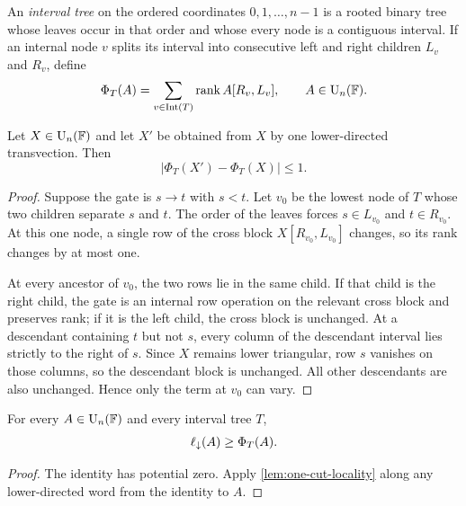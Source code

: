 \begin{definition}
An \emph{interval tree} on the ordered coordinates $0,1,\ldots,n-1$ is a rooted binary tree whose leaves occur in that order and whose every node is a contiguous interval.  If an internal node $v$ splits its interval into consecutive left and right children $L_v$ and $R_v$, define
\begin{equation}\label{eq:tree-potential}
\Phi_T(A)
=
\sum_{v\in\operatorname{Int}(T)}
\operatorname{rank} A[R_v,L_v],
\qquad A\in\operatorname{U}_n(\mathbb F).
\end{equation}
\end{definition}

\begin{lemma}\label{lem:one-cut-locality}
Let $X\in\operatorname{U}_n(\mathbb F)$ and let $X'$ be obtained from $X$ by one lower-directed transvection.  Then
\[
\bigl|\Phi_T(X')-\Phi_T(X)\bigr|\le1.
\]
\end{lemma}

\begin{proof}
Suppose the gate is $s\to t$ with $s<t$.  Let $v_0$ be the lowest node of $T$ whose two children separate $s$ and $t$.  The order of the leaves forces $s\in L_{v_0}$ and $t\in R_{v_0}$.  At this one node, a single row of the cross block $X[R_{v_0},L_{v_0}]$ changes, so its rank changes by at most one.

At every ancestor of $v_0$, the two rows lie in the same child.  If that child is the right child, the gate is an internal row operation on the relevant cross block and preserves rank; if it is the left child, the cross block is unchanged.  At a descendant containing $t$ but not $s$, every column of the descendant interval lies strictly to the right of $s$.  Since $X$ remains lower triangular, row $s$ vanishes on those columns, so the descendant block is unchanged.  All other descendants are also unchanged.  Hence only the term at $v_0$ can vary.
\end{proof}

\begin{corollary}\label{cor:tree-lower-bound}
For every $A\in\operatorname{U}_n(\mathbb F)$ and every interval tree $T$,
\[
\ell_{\downarrow}(A)\ge\Phi_T(A).
\]
\end{corollary}

\begin{proof}
The identity has potential zero.  Apply \cref{lem:one-cut-locality} along any lower-directed word from the identity to $A$.
\end{proof}

